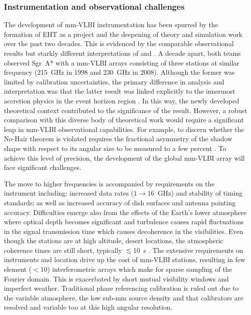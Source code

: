 {\subsubsection{Instrumentation and observational challenges}\label{sec:eht_obs}
The development of mm-VLBI instrumentation has been spurred by the formation of EHT as a project and the deepening of theory and simulation work over the past two decades. This is evidenced by the comparable observational results but starkly different interpretations of \citet{Krichbaum_1998} and \citet{Doeleman_2008}. A decade apart, both teams observed Sgr~A* with a mm-VLBI arrays consisting of three stations at similar frequency (215~GHz in 1998 and 230~GHz in 2008). Although the former was limited by calibration uncertainties, the primary difference in analysis and interpretation was that the latter result was linked explicitly to the innermost accretion physics in the event horizon region \citep[e.g.][]{Broderick_2011}. In this way, the newly developed theoretical context contributed to the significance of the \citet{Doeleman_2008} result. However, a robust comparison with this diverse body of theoretical work would require a significant leap in mm-VLBI observational capabilities. For example, to discern whether the No-Hair theorem is violated requires the fractional asymmetry of the shadow shape with respect to its angular size to be measured to a few percent \citep[e.g.][and references therein]{Goddi_2016}. To achieve this level of precision, the development of the global mm-VLBI array will face significant challenges.


The move to higher frequencies is accompanied by requirements on the instrument including: increased data rates ($1 \to 16$~GHz) and stability of timing standards; as well as increased accuracy of dish surfaces and antenna pointing accuracy. Difficulties emerge also from the effects of the Earth's lower atmosphere where optical depth becomes significant and turbulence causes rapid fluctuations in the signal transmission time which causes decoherence in the visibilities. Even though the stations are at high altitude, desert locations, the atmospheric coherence times are still short, typically $\lesssim$10~s \citep{Doeleman_2009}. The extensive requirements on instruments and location drive up the cost of mm-VLBI stations, resulting in few element ($<10$) interferometric arrays which make for sparse sampling of the Fourier domain. This is exacerbated by short mutual visibility windows and imperfect weather. Traditional phase referencing calibration is ruled out due to the variable atmosphere, the low sub-mm source density and that calibrators are resolved and variable too at this high angular resolution. 


}
